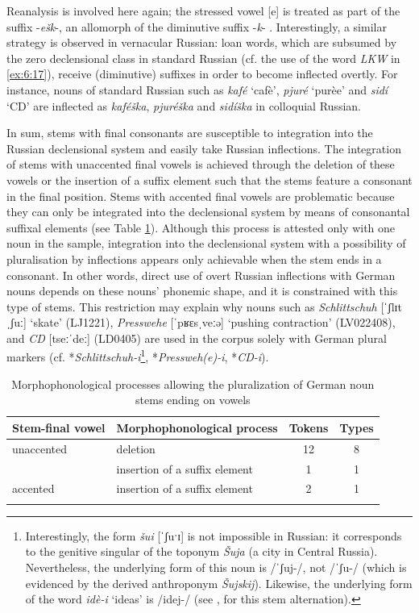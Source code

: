 \noindent Reanalysis is involved here again; the stressed vowel [e] is treated as part of the suffix -\textit{ešk}-, an allomorph of the diminutive suffix -\textit{k}- \citep[2010]{rusgramm-tom1}. Interestingly, a similar strategy is observed in vernacular Russian: loan words, which are subsumed by  the zero declensional class in standard Russian (cf. the use of the word \textit{LKW} in \ref{ex:6:17}), receive (diminutive) suffixes in order to become inflected overtly. For instance, nouns of standard Russian such as \textit{kafé} `cafè', \textit{pjuré} `purèe' and \textit{sidí} ‘CD’ are inflected as \textit{kaféška}, \textit{pjuréška} and \textit{sidíška} in colloquial Russian. 

In sum, stems with final consonants are susceptible to integration into the Russian declensional system and easily take Russian inflections. The integration of stems with unaccented final vowels is achieved through the deletion of these vowels or the insertion of a suffix element such that the stems feature a consonant in the final position. Stems with accented final vowels are problematic because they can only be integrated into the declensional system by means of consonantal suffixal elements (see Table \ref{tab:6:4}). Although this process is attested only with one noun in the sample, integration into the declensional system with a possibility of pluralisation by inflections appears only achievable when the stem ends in a consonant. In other words, direct use of overt Russian inflections with German nouns depends on these nouns’ phonemic shape, and it is constrained with this type of stems. This restriction may explain why nouns such as \textit{Schlittschuh} [ˈʃlɪtˌʃuː] `skate' (LJ1221), \textit{Presswehe} [ˈpʁɛsˌveːə] `pushing contraction' (LV022408), and \textit{CD} [tseːˈdeː] (LD0405) are used in the corpus solely with German plural markers (cf. *\textit{Schlittschuh-i}\footnote{Interestingly, the form \textit{šui} [ˈʃuˑɪ] is not impossible in Russian: it corresponds to the genitive singular of the toponym \textit{Šuja} (a city in Central Russia). Nevertheless, the underlying form of this noun is /ˈʃuj-/, not /ˈʃu-/ (which is evidenced by the derived anthroponym \textit{Šujskij}). Likewise, the underlying form of the word \textit{idè-i} `ideas' is /idej-/ (see \citealt[246]{itkin_2007}, for this stem alternation).}, *\textit{Pressweh(e)-i}, *\textit{CD-i}).

\begin{table}
\begin{tabular}{ll cc}
\lsptoprule
	Stem-final vowel & Morphophonological process & Tokens & Types\\\midrule
	unaccented & deletion & 12 & 8\\
               & insertion of a suffix element & 1 & 1\\ \midrule
	accented   & insertion of a suffix element & 2 & 1\\ 
\lspbottomrule
\end{tabular}
	\caption{Morphophonological processes allowing the pluralization of German noun stems ending on vowels\label{tab:6:4}}
\end{table}

